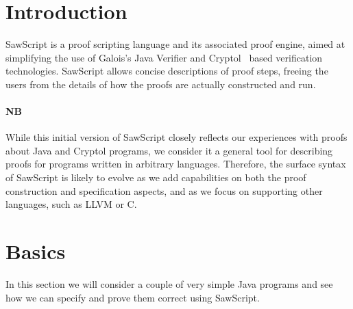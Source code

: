 \documentclass[12pt]{galois-whitepaper}
\author{The Galois SAW Team\\\texttt{saw@galois.com}}
\title{\sawScript}
\date{January 2012}
\newcommand{\sawScript}{{\sc SawScript}\xspace}
\begin{document}
\maketitle

\vspace*{2cm}
\begin{abstract}

We introduce the \sawScript language, aiming to provide a programmable
interface to Galois's Java Verifier and Cryptol based formal
verification technologies. We use various simple Java programs as
examples, inspired the domain of elliptic-curve cryptography. Our proofs
either directly take place within the \sawScript specification language,
or use \sawScript to equivalence check Java functions against their
Cryptol counterparts.

\end{abstract}

\newpage
\tableofcontents
\newpage

\section{Introduction}
\sawScript is a proof scripting language and its associated proof engine, aimed at simplifying the use of Galois's Java Verifier and Cryptol~\cite{Cryptol} based
verification technologies. \sawScript allows concise descriptions of proof steps, freeing the users from the details
of how the proofs are actually constructed and run.

\paragraph{NB} While this initial version of \sawScript closely reflects our experiences with proofs about Java and Cryptol
programs, we consider it a general tool for describing proofs for programs written in arbitrary languages.
Therefore, the surface
syntax of \sawScript is likely to evolve as we add capabilities on both the proof construction and specification
aspects, and as we focus on supporting other languages, such as LLVM or C.

\section{Basics}
In this section we will consider a couple of very simple Java programs and see how we can specify and prove them correct
using \sawScript.
\end{document}
